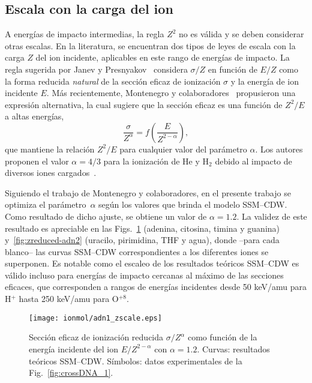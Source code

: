 \subsection{Escala con la carga del ion}
\label{sec:zscaling}

A energías de impacto intermedias, la regla $Z^2$ no es válida y se 
deben considerar otras escalas. En la literatura, se encuentran dos 
tipos de leyes de escala con la carga $Z$ del ion incidente, aplicables 
en este rango de energías de impacto. La regla sugerida por Janev y 
Presnyakov~\cite{Janev:80} considera $\sigma/Z$ en función de $E/Z$ como 
la forma reducida \textit{natural} de la sección eficaz de ionización 
$\sigma$ y la energía de ion incidente $E$. Más recientemente, 
Montenegro y colaboradores~\cite{Dubois:13,Montenegro:13} propusieron 
una expresión alternativa, la cual sugiere que la sección eficaz es una 
función de $Z^2/E$ a altas energías,
\begin{equation}
\frac{\sigma}{Z^{\alpha}}=f\left(\frac{E}{Z^{2-\alpha}}\right),
\label{eq:Montenegro}
\end{equation}
que mantiene la relación $Z^2/E$ para cualquier valor del parámetro 
$\alpha$. Los autores proponen el valor $\alpha=4/3$ para la ionización 
de He y H$_2$ debido al impacto de diversos iones 
cargados~\cite{Dubois:13}. 

Siguiendo el trabajo de Montenegro y colaboradores, en el presente 
trabajo se optimiza el parámetro~$\alpha$ según los valores que brinda 
el modelo SSM--CDW. Como resultado de dicho ajuste, se obtiene un valor
de $\alpha=1.2$. La validez de este resultado es apreciable en las 
Figs.~\ref{fig:zreduced-adn1} (adenina, citosina, timina y guanina) 
y~\ref{fig:zreduced-adn2} (uracilo, pirimidina, THF y agua), donde 
--para cada blanco-- las curvas SSM--CDW correspondientes a los 
diferentes iones se superponen. Es notable como 
el escaleo de los resultados teóricos SSM--CDW es válido incluso para 
energías de impacto cercanas al máximo de las secciones eficaces, que 
corresponden a rangos de energías incidentes desde 50 keV/amu para H$^+$ 
hasta 250 keV/amu para O$^{+8}$.

\begin{figure}
\centering
\texttt{[image: ionmol/adn1\_zscale.eps]}
\caption[Sección eficaz de ionización reducida por $Z$ y $\alpha$ 
(Parte I).]
{Sección eficaz de ionización reducida $\sigma/Z^{\alpha}$ como función
de la energía incidente del ion $E/Z^{2-\alpha}$ con $\alpha=1.2$. 
Curvas: resultados teóricos SSM--CDW. 
Símbolos: datos experimentales de la Fig.~\ref{fig:crossDNA_1}.}
\label{fig:zreduced-adn1}
\end{figure} 


